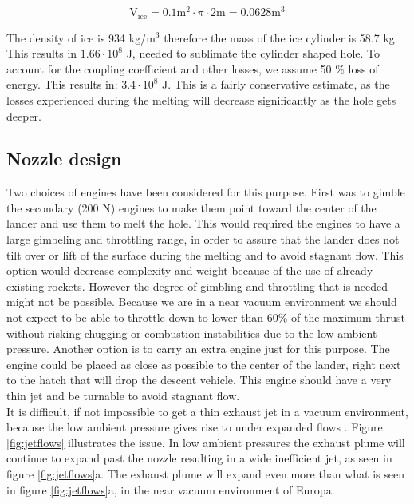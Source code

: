 \begin{equation}
\mathrm{V_{ice}}=0.1 \mathrm{m}^2 \cdot \pi \cdot 2 \mathrm{m} = 0.0628 \mathrm{m}^3
\end{equation}

The density of ice is 934 kg/m$^3$ therefore the mass of the ice cylinder is 58.7 kg. This results in $1.66\cdot 10^8$ J, needed to sublimate the cylinder shaped hole. To account for the coupling coefficient and other losses, we assume 50 \% loss of energy. This results in: $3.4 \cdot 10^8$ J. This is a fairly conservative estimate, as the losses experienced during the melting will decrease significantly as the hole gets deeper. 


\subsection{Nozzle design}

Two choices of engines have been considered for this purpose. First was to gimble the secondary (200 N) engines to make them point toward the center of the lander and use them to melt the hole. This would required the engines to have a large gimbeling and throttling range, in order to assure that the lander does not tilt over or lift of the surface during the melting and to avoid stagnant flow. This option would decrease complexity and weight because of the use of already existing rockets. However the degree of gimbling and throttling that is needed might not be possible. Because we are in a near vacuum environment we should not expect to be able to throttle down to lower than 60\% of the maximum thrust without risking chugging or combustion instabilities due to the low ambient pressure. Another option is to carry an extra engine just for this purpose. The engine could be placed as close as possible to the center of the lander, right next to the hatch that will drop the descent vehicle. This engine should have a very thin jet and be turnable to avoid stagnant flow. \\

It is difficult, if not impossible to get a thin exhaust jet in a vacuum environment, because the low ambient pressure gives rise to under expanded flows \cite{spacecraft}. Figure \ref{fig:jetflows} illustrates the issue. In low ambient pressures the exhaust plume will continue to expand past the nozzle resulting in a wide inefficient jet, as seen in figure \ref{fig:jetflows}a. The exhaust plume will expand even more  than what is seen in figure \ref{fig:jetflows}a, in the near vacuum environment of Europa. 

